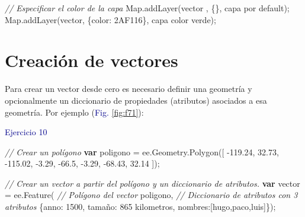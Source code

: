 \documentclass[
  12pt,
  letterpaper,
  twoside]{book}
\newenvironment{Shaded}{\begin{snugshade}}{\end{snugshade}}
\newcommand{\AttributeTok}[1]{\textcolor[rgb]{0.48,0.12,0.64}{#1}}
\newcommand{\CommentTok}[1]{\textcolor[rgb]{0.24,0.58,0.00}{\textit{#1}}}
\newcommand{\ControlFlowTok}[1]{\textcolor[rgb]{0.00,0.00,0.00}{\textbf{#1}}}
\newcommand{\DataTypeTok}[1]{\textcolor[rgb]{0.00,0.00,0.00}{#1}}
\newcommand{\DecValTok}[1]{\textcolor[rgb]{0.28,0.53,0.93}{#1}}
\newcommand{\FloatTok}[1]{\textcolor[rgb]{0.28,0.53,0.93}{#1}}
\newcommand{\FunctionTok}[1]{\textcolor[rgb]{0.48,0.12,0.64}{#1}}
\newcommand{\KeywordTok}[1]{\textcolor[rgb]{0.48,0.12,0.64}{#1}}
\newcommand{\NormalTok}[1]{#1}
\newcommand{\OperatorTok}[1]{\textcolor[rgb]{0.00,0.00,0.00}{#1}}
\newcommand{\StringTok}[1]{\textcolor[rgb]{0.87,0.29,0.22}{#1}}
\begin{document}
\begin{Shaded}
\begin{Highlighting}[]
\CommentTok{// Especificar el color de la capa }
\KeywordTok{Map}\OperatorTok{.}\FunctionTok{addLayer}\NormalTok{(vector }\OperatorTok{,}\NormalTok{ \{\}}\OperatorTok{,} \StringTok{\textquotesingle{}capa por default\textquotesingle{}}\NormalTok{)}\OperatorTok{;}
\KeywordTok{Map}\OperatorTok{.}\FunctionTok{addLayer}\NormalTok{(vector}\OperatorTok{,}\NormalTok{ \{}\DataTypeTok{color}\OperatorTok{:} \StringTok{\textquotesingle{}2AF116\textquotesingle{}}\NormalTok{\}}\OperatorTok{,} \StringTok{\textquotesingle{}capa color verde\textquotesingle{}}\NormalTok{)}\OperatorTok{;}
\end{Highlighting}
\end{Shaded}

\hypertarget{creaciuxf3n-de-vectores}{%
\section{Creación de vectores}\label{creaciuxf3n-de-vectores}}

Para crear un vector desde cero es necesario definir una geometría y opcionalmente un diccionario de propiedades (atributos) asociados a esa geometría. Por ejemplo (\textcolor{darkblue}{Fig.} \ref{fig:f71}):

\textcolor{darkblue}{Ejercicio 10}

\begin{Shaded}
\begin{Highlighting}[]
\CommentTok{// Crear un polígono}
\ControlFlowTok{var}\NormalTok{ poligono }\OperatorTok{=} \KeywordTok{ee}\OperatorTok{.}\AttributeTok{Geometry}\OperatorTok{.}\FunctionTok{Polygon}\NormalTok{([}
  \OperatorTok{{-}}\FloatTok{119.24}\OperatorTok{,} \FloatTok{32.73}\OperatorTok{,}
  \OperatorTok{{-}}\FloatTok{115.02}\OperatorTok{,} \OperatorTok{{-}}\FloatTok{3.29}\OperatorTok{,}
  \OperatorTok{{-}}\FloatTok{66.5}\OperatorTok{,} \OperatorTok{{-}}\FloatTok{3.29}\OperatorTok{,}
  \OperatorTok{{-}}\FloatTok{68.43}\OperatorTok{,} \FloatTok{32.14}
\NormalTok{])}\OperatorTok{;}

\CommentTok{// Crear un vector a partir del polígono y un diccionario de atributos.}
\ControlFlowTok{var}\NormalTok{ vector }\OperatorTok{=} \KeywordTok{ee}\OperatorTok{.}\FunctionTok{Feature}\NormalTok{(}
  \CommentTok{// Polígono del vector}
\NormalTok{  poligono}\OperatorTok{,}                      
  \CommentTok{// Diccionario de atributos con 3 atributos}
\NormalTok{  \{}\DataTypeTok{anno}\OperatorTok{:} \DecValTok{1500}\OperatorTok{,}                    
  \DataTypeTok{tamaño}\OperatorTok{:} \StringTok{\textquotesingle{}865 kilometros\textquotesingle{}}\OperatorTok{,}
  \DataTypeTok{nombres}\OperatorTok{:}\NormalTok{[}\StringTok{\textquotesingle{}hugo\textquotesingle{}}\OperatorTok{,}\StringTok{\textquotesingle{}paco\textquotesingle{}}\OperatorTok{,}\StringTok{\textquotesingle{}luis\textquotesingle{}}\NormalTok{]\})}\OperatorTok{;}
\end{Highlighting}
\end{Shaded}
\end{document}
